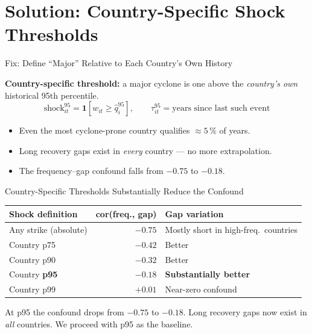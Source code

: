 \documentclass[aspectratio=169,c]{beamer}
\newcommand{\defaultfootline}{%
  \setbeamertemplate{footline}{%
    \hfill{\color{medgray}\scriptsize\insertframenumber\kern14pt}\vskip6pt%
  }%
}
\newcommand{\hideframenumber}{%
  \setbeamertemplate{footline}{}%
  \addtocounter{framenumber}{-1}%
}
\newcommand{\showframenumber}{\defaultfootline}
\begin{document}
\section{Solution: Country-Specific Shock Thresholds}

{\hideframenumber
\begin{frame}
\sectionpage
\end{frame}
\showframenumber}

\begin{frame}{Fix: Define ``Major'' Relative to Each Country's Own History}

\textbf{Country-specific threshold:} a major cyclone is one above the
\emph{country's own} historical 95th percentile.
\[
  \text{shock}^{95}_{it} = \mathbf{1}\!\left[w_{it} \geq \hat{q}^{95}_i\right],
  \qquad
  \tau^{95}_{it} = \text{years since last such event}
\]

\medskip
\begin{itemize}
  \item Even the most cyclone-prone country qualifies $\approx 5$\,\% of years.
  \item Long recovery gaps exist in \emph{every} country --- no more extrapolation.
  \item The frequency--gap confound falls from $-0.75$ to $-0.18$.
\end{itemize}
\end{frame}

\begin{frame}{Country-Specific Thresholds Substantially Reduce the Confound}

\begin{center}
\begin{tabular}{@{}lrp{4.2cm}@{}}
\toprule
Shock definition & cor(freq., gap) & Gap variation \\
\midrule
Any strike (absolute) & $-0.75$ & Mostly short in high-freq.\ countries \\
\midrule
Country p75 & $-0.42$ & Better \\
Country p90 & $-0.32$ & Better \\
Country \textbf{p95} & $\mathbf{-0.18}$ & \textbf{Substantially better} \\
Country p99 & $+0.01$ & Near-zero confound \\
\bottomrule
\end{tabular}
\end{center}

\medskip\small
At p95 the confound drops from $-0.75$ to $-0.18$.
Long recovery gaps now exist in \emph{all} countries.
We proceed with p95 as the baseline.
\end{frame}
\end{document}
